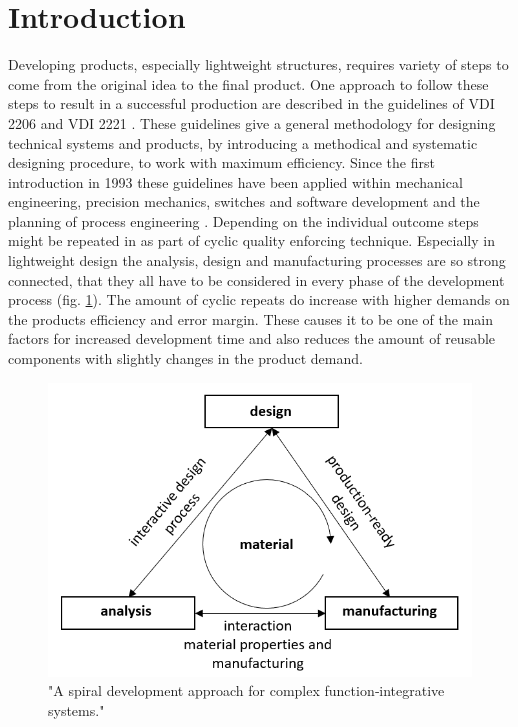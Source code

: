 \section{\label{sec:SoA}Introduction}
Developing products, especially lightweight structures, 
requires variety of steps to come from the original idea to the final product.
One approach to follow these steps to result in a successful production 
are described in the guidelines of VDI 2206 \cite{gausmeier2002} and VDI 2221 \cite{Jansch2006THEDO}.
These guidelines give a general methodology for designing technical systems and products, 
by introducing a methodical and systematic designing procedure, to work with maximum efficiency.
Since the first introduction in 1993 these guidelines have been applied within mechanical engineering, precision mechanics, 
switches and software development and the planning of process engineering \cite{pahl_beitz_2013}. 
Depending on the individual outcome steps might be repeated in as part of cyclic quality enforcing technique.
Especially in lightweight design the analysis, design and manufacturing processes are so strong connected, 
that they all have to be considered in every phase of the development process (fig. \ref{pic:interactive-design}).
The amount of cyclic repeats do increase with higher demands on the products efficiency and error margin.
These causes it to be one of the main factors for increased development time and 
also reduces the amount of reusable components with slightly changes in the product demand.\\
\begin{figure}[h]
    \centering
    \includegraphics[scale=0.4]{pics/interactive-design.PNG}
    \caption{\label{pic:interactive-design} "A spiral development approach for complex function‐integrative systems." \cite{bohm_interaktiver_2020}}
\end{figure}\\
